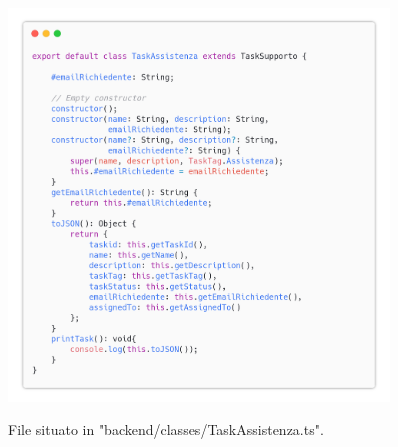 \documentclass{report}
\begin{document}
\begin{figure}[H]
	\centering\includegraphics[width=0.9\textwidth]{images/code_task_assistenza.png}
	
	File situato in "backend/classes/TaskAssistenza.ts".
\end{figure}
\end{document}
